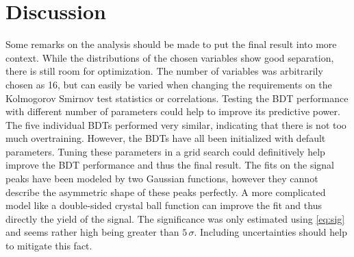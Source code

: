 \section{Discussion}
\label{sec:Discussion}

Some remarks on the analysis should be made to put the final result into more context.
While the distributions of the chosen variables show good separation, there is still room for optimization. The number of variables was arbitrarily chosen as 16,
but can easily be varied when changing the requirements on the Kolmogorov Smirnov test statistics or correlations. Testing the BDT performance with different number of
parameters could help to improve its predictive power. The five individual BDTs performed very similar, indicating that there is not too much overtraining.
However, the BDTs have all been initialized with default parameters. Tuning these parameters in a grid search could definitively help improve the BDT performance and thus
the final result.
The fits on the signal peaks have been modeled by two Gaussian functions, however they cannot describe the asymmetric shape of these peaks perfectly.
A more complicated model like a double-sided crystal ball function can improve the fit and thus directly the yield of the signal.
The significance was only estimated using \eqref{eq:sig} and seems rather high being greater than $5 \, \sigma$. Including uncertainties should help to mitigate this fact.